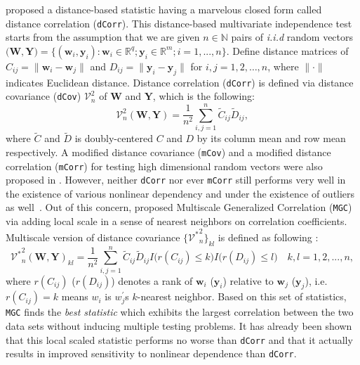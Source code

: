 \documentclass[11pt]{article}
\theoremstyle{definition}
\begin{document}
\cite{szekely2007measuring} proposed a distance-based statistic having a marvelous closed form called distance correlation (\texttt{dCorr}). This distance-based multivariate independence test starts from the assumption that we are given $n \in \mathbb{N}$ pairs of \textit{i.i.d} random vectors $\big(  \mathbf{W}, \mathbf{Y}  \big)  = \{ (\mathbf{w}_{i}, \mathbf{y}_{i}) : \mathbf{w}_{i} \in \mathbb{R}^{q}; \mathbf{y}_{i} \in \mathbb{R}^{m}; i = 1,...,n \}$. Define distance matrices of $C_{ij} = \parallel \mathbf{w}_{i} - \mathbf{w}_{j} \parallel$ and $D_{ij} = \parallel \mathbf{y}_{i} - \mathbf{y}_{j} \parallel$ for $i,j=1,2, \ldots ,n$, where $\parallel \cdot \parallel$ indicates Euclidean distance.
Distance correlation (\texttt{dCorr}) is defined via distance covariance (\texttt{dCov}) $\mathcal{V}^2_{n}$ of $\mathbf{W}$ and $\mathbf{Y}$, which is the following: 
\begin{equation}	 
\label{eq:dCov}
\mathcal{V}^2_{n}(\mathbf{W}, \mathbf{Y}) = \frac{1}{n^2} \sum\limits_{i,j=1}^{n} \tilde{C}_{ij} \tilde{D}_{ij},
\end{equation}
where $\tilde{C}$ and $\tilde{D}$ is doubly-centered $C$ and $D$ by its column mean and row mean respectively. A modified distance covariance (\texttt{mCov}) and a modified distance correlation (\texttt{mCorr}) for testing high dimensional random vectors were also proposed in \cite{szekely2013distance}. However, neither \texttt{dCorr} nor ever \texttt{mCorr} still performs very well in the existence of various nonlinear dependency and under the existence of outliers as well~\citep{shen2016discovering}. Out of this concern, \cite{shen2016discovering} proposed Multiscale Generalized Correlation (\texttt{MGC}) via adding local scale in a sense of nearest neighbors on correlation coefficients. Multiscale version of distance covariance $\{ { {\mathcal{V}^{*}}^2_{n} }   \}_{kl}$ is defined as following : 
\begin{equation}
\label{eq:MGC}
{\mathcal{V}^{*}}^2_{n} (\mathbf{W}, \mathbf{Y})_{kl} = \frac{1}{n^2} \sum\limits_{i,j=1}^{n} \tilde{C}_{ij} \tilde{D}_{ij} I \big( r(C_{ij}) \leq k \big) I \big( r(D_{ij}) \leq l  \big) \quad k,l=1,2,..., n ,
\end{equation}
where $r(C_{ij})$ ($r(D_{ij})$) denotes a rank of $\mathbf{w}_{i}$ ($\mathbf{y}_{i}$) relative to $\mathbf{w}_{j}$ ($\mathbf{y}_{j}$), i.e.~$r(C_{ij}) = k$ means $w_{i}$ is $w^{'}_{j}$s $k$-nearest neighbor. Based on this set of statistics, \texttt{MGC} finds the \textit{best statistic} which exhibits the largest correlation between the two data sets without inducing multiple testing problems. It has already been shown that this local scaled statistic performs no worse than \texttt{dCorr} and that it actually results in improved sensitivity to nonlinear dependence than \texttt{dCorr}. 
\end{document}
